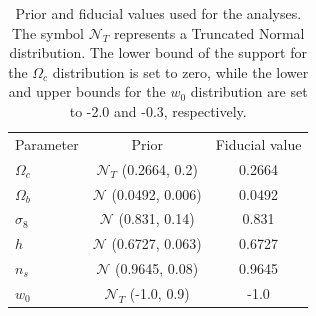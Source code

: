 \documentclass{aa}
\begin{document}
\begin{table}
	\centering
	\caption{ Prior and fiducial values used for the analyses. 
 The symbol $\mathcal{N}_T$ represents a Truncated Normal distribution. The lower bound of the support for the $\Omega_c$ distribution is set to zero, while the lower and upper bounds for the $w_0$ distribution are set to -2.0 and -0.3, respectively.}
	\begin{tabular}{lcc} 
		\hline \hline
		Parameter  & Prior & Fiducial value \\
		$\Omega_c$ & $\mathcal{N}_T$ (0.2664, 0.2) & 0.2664 \\
		$\Omega_b$ & $\mathcal{N}$ (0.0492, 0.006) & 0.0492 \\
		$\sigma_8$ & $\mathcal{N}$ (0.831, 0.14) & 0.831 \\
		$h$ & $\mathcal{N}$ (0.6727, 0.063) & 0.6727\\
		$n_s$ & $\mathcal{N}$ (0.9645, 0.08) & 0.9645 \\
		$w_{0}$ &  $\mathcal{N}_T$ (-1.0, 0.9) &  -1.0 \\
		\hline
	\end{tabular}
	\label{tab:prior}
\end{table}
\end{document}
